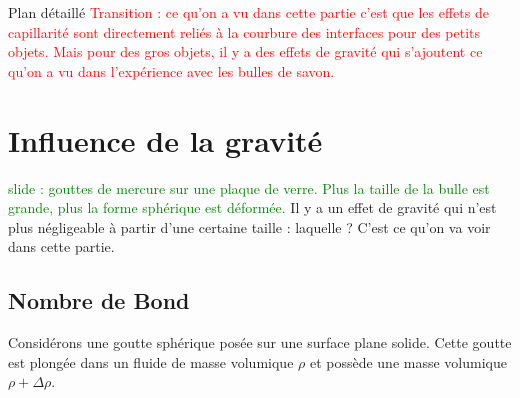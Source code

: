 \begin{reportBlock}{Plan détaillé}
\textcolor{red}{Transition : ce qu'on a vu dans cette partie c'est que les effets de capillarité sont directement reliés à la courbure des interfaces pour des petits objets. Mais pour des gros objets, il y a des effets de gravité qui s'ajoutent ce qu'on a vu dans l'expérience avec les bulles de savon.}

  \section{Influence de la gravité}
  
  \textcolor{green}{slide : gouttes de mercure sur une plaque de verre. Plus la taille de la bulle est grande, plus la forme sphérique est déformée.}
  Il y a un effet de gravité qui n'est plus négligeable à partir d'une certaine taille : laquelle ? C'est ce qu'on va voir dans cette partie.
  
  \subsection{Nombre de Bond}
  Considérons une goutte sphérique posée sur une surface plane solide. Cette goutte est plongée dans un fluide de masse volumique $\rho$ et possède une masse volumique $\rho+\Delta\rho$.\\
  

\end{reportBlock}
